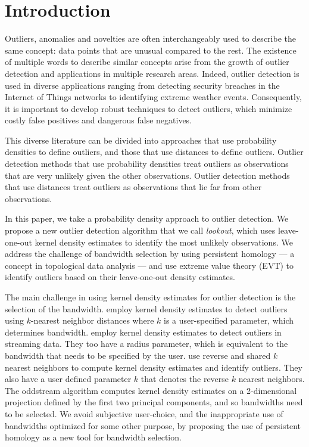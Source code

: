 \documentclass[12pt]{article}
\theoremstyle{definition}
\theoremstyle{definition}
\theoremstyle{definition}
\theoremstyle{remark}
\begin{document}
\hypertarget{introduction}{%
\section{Introduction}\label{introduction}}

Outliers, anomalies and novelties are often interchangeably used to describe the same concept: data points that are unusual compared to the rest. The existence of multiple words to describe similar concepts arise from the growth of outlier detection and applications in multiple research areas. Indeed, outlier detection is used in diverse applications ranging from detecting security breaches in the Internet of Things networks to identifying extreme weather events. Consequently, it is important to develop robust techniques to detect outliers, which minimize costly false positives and dangerous false negatives.

This diverse literature can be divided into approaches that use probability densities to define outliers, and those that use distances to define outliers. Outlier detection methods that use probability densities treat outliers as observations that are very unlikely given the other observations. Outlier detection methods that use distances treat outliers as observations that lie far from other observations.

In this paper, we take a probability density approach to outlier detection. We propose a new outlier detection algorithm that we call \emph{lookout}, which uses leave-one-out kernel density estimates to identify the most unlikely observations. We address the challenge of bandwidth selection by using persistent homology --- a concept in topological data analysis --- and use extreme value theory (EVT) to identify outliers based on their leave-one-out density estimates.

The main challenge in using kernel density estimates for outlier detection is the selection of the bandwidth. \citet{Schubert2014} employ kernel density estimates to detect outliers using \(k\)-nearest neighbor distances where \(k\) is a user-specified parameter, which determines bandwidth. \citet{Qin2019} employ kernel density estimates to detect outliers in streaming data. They too have a radius parameter, which is equivalent to the bandwidth that needs to be specified by the user. \citet{Tang2017} use reverse and shared \(k\) nearest neighbors to compute kernel density estimates and identify outliers. They also have a user defined parameter \(k\) that denotes the reverse \(k\) nearest neighbors. The oddstream algorithm \citep{talagala2019anomaly} computes kernel density estimates on a 2-dimensional projection defined by the first two principal components, and so bandwidths need to be selected. We avoid subjective user-choice, and the inappropriate use of bandwidths optimized for some other purpose, by proposing the use of persistent homology as a new tool for bandwidth selection.
\end{document}
